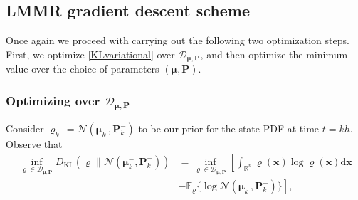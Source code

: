 \documentclass[letterpaper,10pt,twocolumn,conference]{ieeeconf}
\newcommand{\cD}{{\mathscr{D}}}
\newcommand{\bbc}{\bm{c}}
\newcommand{\bbx}{{\bm{x}}}
\newcommand{\bby}{{\bm{y}}}
\newcommand{\bbz}{\bm{z}}
\newcommand{\bbmu}{\bm{\mu}}
\newcommand{\bbP}{\bm{P}}
\newcommand{\bbR}{\bm{R}}
\newcommand{\bbI}{\bm{I}}
\newcommand{\arginf}{\operatorname{arg\:inf}}
\begin{document}
\subsection{LMMR gradient descent scheme}\label{PrashantSubsection}

Once again we proceed with carrying out the following two optimization steps. First, we optimize \eqref{KLvariational} over $\cD_{\bm{\mu},\bm{P}}$, and then optimize the minimum value over the choice of parameters $({\bm{\mu},\bm{P}})$.

\subsubsection{Optimizing over $\cD_{\bm{\mu},\bm{P}}$}\label{FirstStepLaugesen}
Consider $\varrho_{k}^{-} = \mathcal{N}(\bbmu_{k}^{-},\bbP_{k}^{-})$ to be our prior for the state PDF at time $t=kh$. Observe that 
{\small{\begin{align}
\underset{\varrho\in\mathscr{D}_{\bbmu,\bbP}}{\inf}D_{\mathrm{KL}}\left(\varrho\|\mathcal{N}(\bbmu_{k}^{-},\bbP_{k}^{-})\right) &= \underset{\varrho\in\mathscr{D}_{\bbmu,\bbP}}{\inf} \left[\int_{\mathbb{R}^{n}} \varrho(\bbx)\log\varrho(\bbx)\mathrm{d}\bbx \right.\nonumber\\
&\left. - \mathbb{E}_{\varrho}\{\log\mathcal{N}(\bbmu_{k}^{-},\bbP_{k}^{-})\}\right],
\label{DKLalone}	
\end{align}}}
\end{document}
